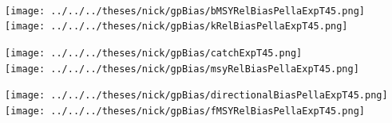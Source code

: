 \documentclass[ xcolor = pdftex, dvipsnames, table ]{beamer}
\begin{document}
%
\begin{frame}%
$~$
\hspace*{-1.25cm}
\begin{minipage}[h!]{0.33\textwidth}
\hspace*{0.25cm}
\texttt{[image: ../../../theses/nick/gpBias/bMSYRelBiasPellaExpT45.png]}\\
\hspace*{0.25cm}
\texttt{[image: ../../../theses/nick/gpBias/kRelBiasPellaExpT45.png]}
\end{minipage}
\begin{minipage}[h!]{0.33\textwidth}
\hspace*{0.75cm}
\texttt{[image: ../../../theses/nick/gpBias/catchExpT45.png]}\\
\hspace*{0.75cm}
\texttt{[image: ../../../theses/nick/gpBias/msyRelBiasPellaExpT45.png]}
\end{minipage}
\begin{minipage}[h!]{0.33\textwidth}
\hspace*{1cm}
\texttt{[image: ../../../theses/nick/gpBias/directionalBiasPellaExpT45.png]}\\
\hspace*{1cm}
\texttt{[image: ../../../theses/nick/gpBias/fMSYRelBiasPellaExpT45.png]}
\end{minipage}
\end{frame}
\end{document}

